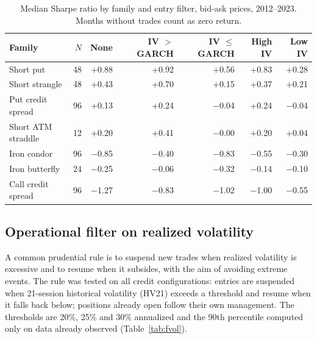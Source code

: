 \documentclass[11pt,a4paper]{article}
\begin{document}
\begin{table}[ht]\centering\small
\caption{Median Sharpe ratio by family and entry filter, bid-ask prices, 2012--2023. Months without trades count as zero return.}\label{tab:filt}
\begin{tabular}{lrrrrrr}\toprule
Family & $N$ & None & IV $>$ GARCH & IV $\le$ GARCH & High IV & Low IV \\ \midrule
Short put & 48 & +0.88 & +0.92 & +0.56 & +0.83 & +0.28 \\
Short strangle & 48 & +0.43 & +0.70 & +0.15 & +0.37 & +0.21 \\
Put credit spread & 96 & +0.13 & +0.24 & $-$0.04 & +0.24 & $-$0.04 \\
Short ATM straddle & 12 & +0.20 & +0.41 & $-$0.00 & +0.20 & +0.04 \\
Iron condor & 96 & $-$0.85 & $-$0.40 & $-$0.83 & $-$0.55 & $-$0.30 \\
Iron butterfly & 24 & $-$0.25 & $-$0.06 & $-$0.32 & $-$0.14 & $-$0.10 \\
Call credit spread & 96 & $-$1.27 & $-$0.83 & $-$1.02 & $-$1.00 & $-$0.55 \\
\bottomrule\end{tabular}\end{table}

\subsection{Operational filter on realized volatility}\label{sec:fvol}

A common prudential rule is to suspend new trades when realized volatility is excessive and to resume when it subsides, with the aim of avoiding extreme events. The rule was tested on all credit configurations: entries are suspended when 21-session historical volatility (HV21) exceeds a threshold and resume when it falls back below; positions already open follow their own management. The thresholds are 20\%, 25\% and 30\% annualized and the 90th percentile computed only on data already observed (Table~\ref{tab:fvol}).
\end{document}
